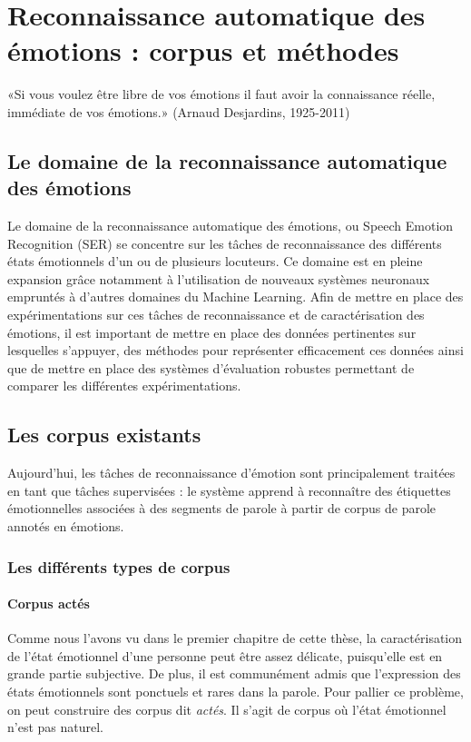 \chapter{Reconnaissance automatique des émotions : corpus et méthodes}
\label{chapitre3}
«Si vous voulez être libre de vos émotions il faut avoir la connaissance réelle, immédiate de vos émotions.»  (Arnaud Desjardins, 1925-2011)


\section{Le domaine de la reconnaissance automatique des émotions}
Le domaine de la reconnaissance automatique des émotions, ou Speech Emotion Recognition (SER) se concentre sur les tâches de reconnaissance des différents états émotionnels d'un ou de plusieurs locuteurs. Ce domaine est en pleine expansion grâce notamment à l'utilisation de nouveaux systèmes neuronaux empruntés à d'autres domaines du Machine Learning.
Afin de mettre en place des expérimentations sur ces tâches de reconnaissance et de caractérisation des émotions, il est important de mettre en place des données pertinentes sur lesquelles s'appuyer, des méthodes pour représenter efficacement ces données ainsi que de mettre en place des systèmes d'évaluation robustes permettant de comparer les différentes expérimentations.

\section{Les corpus existants}
Aujourd'hui, les tâches de reconnaissance d'émotion sont principalement traitées en tant que tâches supervisées : le système apprend à reconnaître des étiquettes émotionnelles associées à des segments de parole à partir de corpus de parole annotés en émotions.

\subsection{Les différents types de corpus}
\subsubsection{Corpus actés}
Comme nous l'avons vu dans le premier chapitre de cette thèse, la caractérisation de l'état émotionnel d'une personne peut être assez délicate, puisqu'elle est en grande partie subjective. De plus, il est communément admis que l'expression des états émotionnels sont ponctuels et rares dans la parole. Pour pallier ce problème, on peut construire des corpus dit \textit{actés}. Il s'agit de corpus où l'état émotionnel n'est pas naturel.

